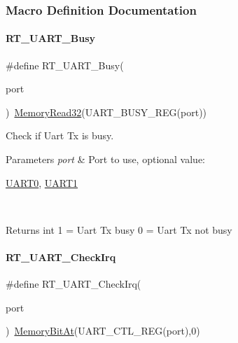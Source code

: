 \subsubsection{Macro Definition Documentation}
\mbox{\label{a00098_a3ab834a97a200601f16b923a705f3f01}} 
\paragraph{\texorpdfstring{R\+T\+\_\+\+U\+A\+R\+T\+\_\+\+Busy}{RT\_UART\_Busy}}
{\footnotesize\ttfamily \#define R\+T\+\_\+\+U\+A\+R\+T\+\_\+\+Busy(\begin{DoxyParamCaption}\item[{}]{port }\end{DoxyParamCaption})~\mbox{\hyperlink{a00026_a2d484dc15bdf30ee11ab3b05f31f0e16}{Memory\+Read32}}(U\+A\+R\+T\+\_\+\+B\+U\+S\+Y\+\_\+\+R\+EG(port))}



Check if Uart Tx is busy. 


\begin{DoxyParams}{Parameters}
{\em port} & Port to use, optional value\+:
\begin{DoxyCode}
\mbox{\hyperlink{a00098_a0508661f121639ffdee7de2353a0def2}{UART0}}, \mbox{\hyperlink{a00098_a8d69bf04d07af4fbbab5a8bd291f65ff}{UART1}}
\end{DoxyCode}
 \\
\hline
\end{DoxyParams}
\begin{DoxyReturn}{Returns}
int 1 = Uart Tx busy 0 = Uart Tx not busy 
\end{DoxyReturn}
\mbox{\label{a00098_a3e29e879f76b82a13419f4d59a1c3053}} 
\paragraph{\texorpdfstring{R\+T\+\_\+\+U\+A\+R\+T\+\_\+\+Check\+Irq}{RT\_UART\_CheckIrq}}
{\footnotesize\ttfamily \#define R\+T\+\_\+\+U\+A\+R\+T\+\_\+\+Check\+Irq(\begin{DoxyParamCaption}\item[{}]{port }\end{DoxyParamCaption})~\mbox{\hyperlink{a00026_afc530c7e6b49b0ca97c1ad9dac1c4750}{Memory\+Bit\+At}}(U\+A\+R\+T\+\_\+\+C\+T\+L\+\_\+\+R\+EG(port),0)}



